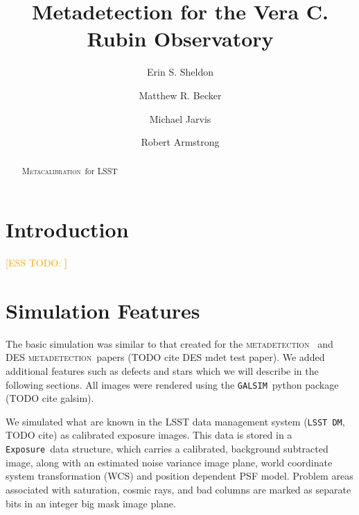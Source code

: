 \documentclass[iop, twocolappendix, appendixfloats, numberedappendix, apj]{hackemulateapj}
\newcommand{\esstodo}[1]{\textcolor{orange}{[ESS TODO: \bf #1]}}
\newcommand{\galsim}{\texttt{GALSIM}}
\newcommand{\calexp}{\texttt{Exposure}}
\newcommand{\dm}{\texttt{LSST DM}}
\newcommand{\mdet}{\textsc{metadetection}}
\newcommand{\Mcal}{\textsc{Metacalibration}}
\newcommand{\Mdet}{\textsc{Metadetection}}
\begin{document}



\title{Metadetection for the Vera C. Rubin Observatory}

\author{Erin S. Sheldon}
\author{Matthew R. Becker}
\author{Michael Jarvis}
\author{Robert Armstrong}


\begin{abstract}

    \Mcal\ for LSST

\end{abstract}


\section{Introduction} \label{sec:intro}

\esstodo{}

\section{Simulation Features} \label{sec:sim}

The basic simulation was similar to that created for the \mdet\ \citep{mdet20}
and DES \mdet\ papers (TODO cite DES mdet test paper). We added additional
features such as defects and stars which we will describe in the following
sections.  All images were rendered using the \galsim\ python package (TODO
cite galsim).

We simulated what are known in the LSST data management system (\dm, TODO cite)
as calibrated exposure images.  This data is stored in a \calexp\ data
structure, which carries a calibrated, background subtracted image, along with
an estimated noise variance image plane, world coordinate system transformation
(WCS) and position dependent PSF model.  Problem areas associated with
saturation, cosmic rays, and bad columns are marked as separate bits in an
integer big mask image plane.
\end{document}

